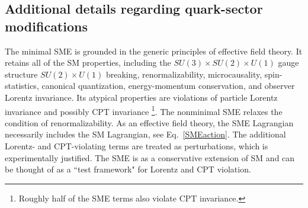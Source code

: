 \subsection{Additional details regarding quark-sector modifications}
\label{ssec:theorydetails}
%
The minimal SME is grounded in the 
generic principles of effective field theory. 
It retains all of the SM properties, including
the $SU(3)\times SU(2)\times U(1)$ gauge structure
$SU(2)\times U(1)$ breaking, renormalizability, 
microcausality, spin-statistics, 
canonical quantization, energy-momentum conservation, and observer
Lorentz invariance. Its atypical properties are violations 
of particle Lorentz invariance and 
possibly CPT invariance
\footnote{Roughly half of the SME terms also violate CPT invariance.}.
The nonminimal SME relaxes the condition of renormalizability. 
As an effective field theory, the SME Lagrangian 
necessarily includes the SM Lagrangian, 
see Eq.~\eqref{SMEaction}. The additional Lorentz- and CPT-violating
terms are treated as perturbations, which is experimentally justified.
The SME is as a conservative extension of SM and
can be thought of as a 
``test framework" for Lorentz and CPT violation.


